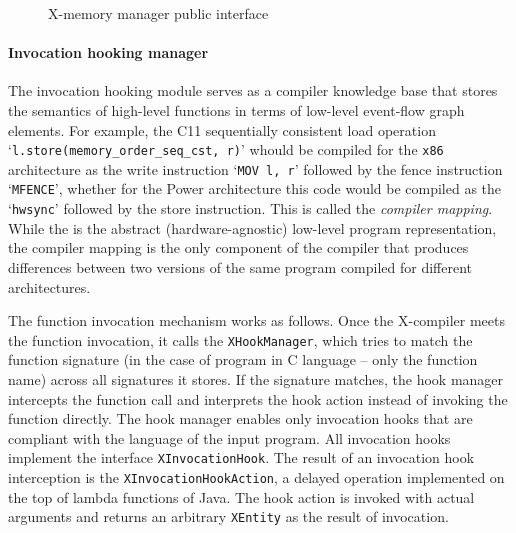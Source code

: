 \begin{figure}[h]
\centering
\begin{minipage}[t]{.9\textwidth}%

\end{minipage}
\caption{X-memory manager public interface}
\label{fig:mem-manager}
\end{figure}


\paragraph{Invocation hooking manager}

The invocation hooking module serves as a compiler knowledge base that stores the semantics of high-level functions in terms of low-level event-flow graph elements.
For example, the C11 sequentially consistent load operation `\lstinline{l.store(memory_order_seq_cst, r)}' whould be compiled for the \texttt{x86} architecture as the write instruction `\lstinline{MOV l, r}' followed by the fence instruction `\lstinline{MFENCE}', whether for the Power architecture this code would be compiled as the `\lstinline{hwsync}' followed by the store instruction.
This is called the \textit{compiler mapping}.
While the \xgraph{} is the abstract (hardware-agnostic) low-level program representation, the compiler mapping is the only component of the compiler that produces differences between two versions of the same program compiled for different architectures.
 
The function invocation mechanism works as follows.
Once the X-compiler meets the function invocation, it calls the \texttt{XHookManager}, which tries to match the function signature (in the case of program in C language -- only the function name) across all signatures it stores.
If the signature matches, the hook manager intercepts the function call and interprets the hook action instead of invoking the function directly.
The hook manager enables only invocation hooks that are compliant with the language of the input program.
All invocation hooks implement the interface \texttt{XInvocationHook}.
The result of an invocation hook interception is the \texttt{XInvocationHookAction}, a delayed operation implemented on the top of lambda functions of Java.
The hook action is invoked with actual arguments and returns an arbitrary \texttt{XEntity} as the result of invocation.

